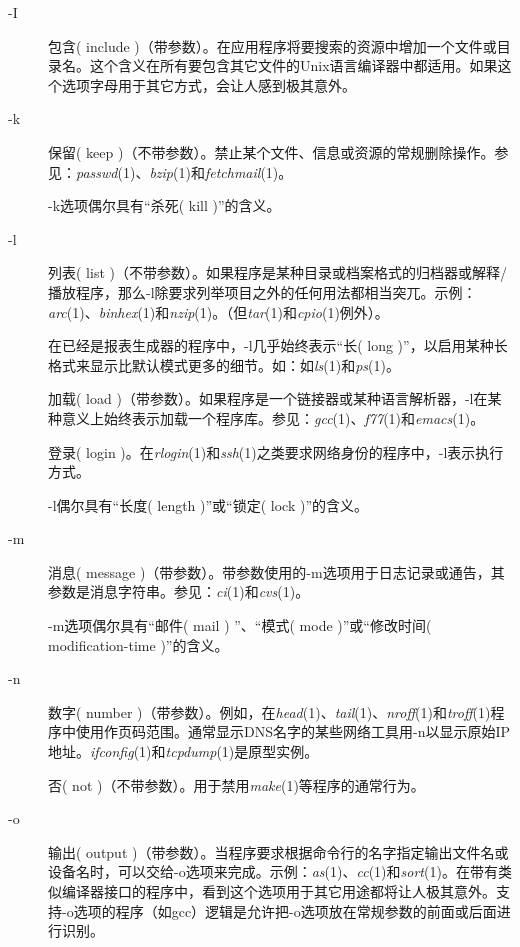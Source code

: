 \documentclass[12pt,oneside]{book}
\begin{document}
\begin{common-format}
\begin{description}
\item[-I] 包含( include )（带参数）。在应用程序将要搜索的资源中增加一个文件或目录名。这个含义在所有要包含其它文件的Unix语言编译器中都适用。如果这个选项字母用于其它方式，会让人感到极其意外。

\item[-k] 保留( keep )（不带参数）。禁止某个文件、信息或资源的常规删除操作。参见：\textit{passwd}(1)、\textit{bzip}(1)和\textit{fetchmail}(1)。

-k选项偶尔具有“杀死( kill )”的含义。

\item[-l] 列表( list )（不带参数）。如果程序是某种目录或档案格式的归档器或解释/播放程序，那么-l除要求列举项目之外的任何用法都相当突兀。示例：\textit{arc}(1)、\textit{binhex}(1)和\textit{nzip}(1)。（但\textit{tar}(1)和\textit{cpio}(1)例外）。

在已经是报表生成器的程序中，-l几乎始终表示“长( long )”，以启用某种长格式来显示比默认模式更多的细节。如：如\textit{ls}(1)和\textit{ps}(1)。

加载( load )（带参数）。如果程序是一个链接器或某种语言解析器，-l在某种意义上始终表示加载一个程序库。参见：\textit{gcc}(1)、\textit{f77}(1)和\textit{emacs}(1)。

 登录( login )。在\textit{rlogin}(1)和\textit{ssh}(1)之类要求网络身份的程序中，-l表示执行方式。

-l偶尔具有“长度( length )”或“锁定( lock )”的含义。

\item[-m] 消息( message )（带参数）。带参数使用的-m选项用于日志记录或通告，其参数是消息字符串。参见：\textit{ci}(1)和\textit{cvs}(1)。

-m选项偶尔具有“邮件( mail ) ”、“模式( mode )”或“修改时间( modification-time )”的含义。

\item[-n] 数字( number )（带参数）。例如，在\textit{head}(1)、\textit{tail}(1)、\textit{nroff}(1)和\textit{troff}(1)程序中使用作页码范围。通常显示DNS名字的某些网络工具用-n以显示原始IP地址。\textit{ifconfig}(1)和\textit{tcpdump}(1)是原型实例。

否( not )（不带参数）。用于禁用\textit{make}(1)等程序的通常行为。

\item[-o] 输出( output )（带参数）。当程序要求根据命令行的名字指定输出文件名或设备名时，可以交给-o选项来完成。示例：\textit{as}(1)、\textit{cc}(1)和\textit{sort}(1)。在带有类似编译器接口的程序中，看到这个选项用于其它用途都将让人极其意外。支持-o选项的程序（如gcc）逻辑是允许把-o选项放在常规参数的前面或后面进行识别。


\end{description}
\end{common-format}
\end{document}
